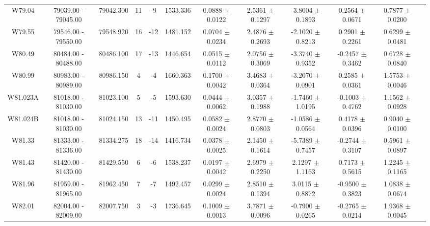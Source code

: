 \documentclass{article}
\begin{document}
\begin{table}[h]
{\begin{tabular}{|c|c|c|c|c|c|c|c|c|c|c|c|}
W79.04 & 79039.00 - 79045.00 & 79042.300 & 11 & -9 & 1533.336 & 0.0888 $\pm$ 0.0122 & 2.5361 $\pm$ 0.1297 & -3.8004 $\pm$ 0.1893 & 0.2564 $\pm$ 0.0671 & 0.7877 $\pm$ 0.0200 \\

W79.55 & 79546.00 - 79550.00 & 79548.920 & 16 & -12 & 1481.152 & 0.0704 $\pm$ 0.0234 & 2.4876 $\pm$ 0.2693 &  -2.1020 $\pm$ 0.8213 & 0.2901 $\pm$ 0.2261 & 0.6299 $\pm$ 0.0481 \\

W80.49 & 80484.00 - 80488.00 & 80486.100 & 17 & -13 & 1446.654 & 0.0515 $\pm$ 0.0112 & 2.0756 $\pm$ 0.3069 &  -3.3740 $\pm$ 0.9352 & -0.2457 $\pm$ 0.3462 & 0.6728 $\pm$ 0.0840 \\

W80.99 & 80983.00 - 80989.00 & 80986.150 & 4 & -4 & 1660.363 & 0.1700 $\pm$ 0.0042 & 3.4683 $\pm$ 0.0364 &  -3.2070 $\pm$ 0.0901 & 0.2585 $\pm$ 0.0361 & 1.5753 $\pm$ 0.0046 \\

W81.023A & 81018.00 - 81030.00 & 81023.100 & 5 & -5 & 1593.630 & 0.0444 $\pm$ 0.0062 & 3.0357 $\pm$ 0.1988 &  -1.7460 $\pm$ 1.0195 & -0.1003 $\pm$ 0.4762 & 1.1562 $\pm$ 0.0928 \\

W81.024B & 81018.00 - 81030.00 & 81024.150 & 13 & -11 & 1450.495 & 0.0582 $\pm$ 0.0024 &  2.8770 $\pm$ 0.0803 & -1.0586 $\pm$ 0.0564 & 0.4178 $\pm$ 0.0396 & 0.9040 $\pm$ 0.0100 \\
         
W81.33 & 81333.00 - 81336.00 & 81334.275 & 18 & -14 & 1416.734 & 0.0378 $\pm$ 0.0025 & 2.1450 $\pm$ 0.1614 & -5.7389 $\pm$ 0.7457 & -0.2744 $\pm$ 0.3107 & 0.5961 $\pm$ 0.0897 \\

W81.43 & 81420.00 - 81430.00 & 81429.550 & 6 & -6 & 1538.237 & 0.0197 $\pm$ 0.0042 & 2.6979 $\pm$ 0.2250 &  2.1297 $\pm$ 1.1163 & 0.7173 $\pm$ 0.5615 & 1.2245 $\pm$ 0.1165 \\

W81.96 & 81959.00 - 81965.00 & 81962.450 & 7 & -7 & 1492.457 & 0.0299 $\pm$ 0.0024 & 2.8510 $\pm$ 0.1394 &  3.0115 $\pm$ 0.8872 & -0.9500 $\pm$ 0.3823 & 1.0838 $\pm$ 0.0674 \\

W82.01 & 82004.00 - 82009.00 & 82007.750 & 3 & -3 & 1736.645 & 0.1009 $\pm$ 0.0013 & 3.7871 $\pm$ 0.0096 &   -0.7900 $\pm$ 0.0265 & -0.2765 $\pm$ 0.0214 & 1.9368 $\pm$ 0.0045 \\
         

\end{tabular}}
\end{table}
\end{document}

